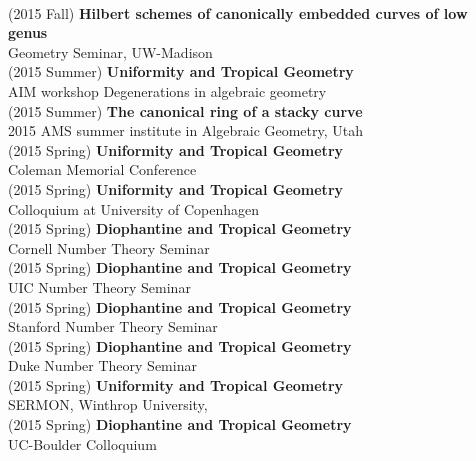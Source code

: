 \documentclass[margin,line]{res}
\begin{document}
\begin{resume}
\vspace{.05cm}\\
(2015 Fall) \textbf{Hilbert schemes of canonically embedded curves of low genus}\\
Geometry Seminar, UW-Madison
\vspace{.05cm}\\
(2015 Summer) \textbf{Uniformity and Tropical Geometry}\\
AIM workshop Degenerations in algebraic geometry
\vspace{.05cm}\\
(2015 Summer) \textbf{The canonical ring of a stacky curve}\\  
2015 AMS summer institute in Algebraic Geometry, Utah
\vspace{.05cm}\\
(2015 Spring) \textbf{Uniformity and Tropical Geometry}\\
Coleman Memorial Conference
\vspace{.05cm}\\
(2015 Spring) \textbf{Uniformity and Tropical Geometry}\\
Colloquium at University of Copenhagen
\vspace{.05cm}\\
(2015 Spring) \textbf{Diophantine and Tropical Geometry}\\
Cornell Number Theory Seminar
\vspace{.05cm}\\
(2015 Spring) \textbf{Diophantine and Tropical Geometry}\\
UIC Number Theory Seminar
\vspace{.05cm}\\
(2015 Spring) \textbf{Diophantine and Tropical Geometry}\\
Stanford Number Theory Seminar
\vspace{.05cm}\\
(2015 Spring) \textbf{Diophantine and Tropical Geometry}\\
Duke Number Theory Seminar
\vspace{.05cm}\\
(2015 Spring) \textbf{Uniformity and Tropical Geometry}\\
SERMON, Winthrop University, 
\vspace{.05cm}\\
(2015 Spring) \textbf{Diophantine and Tropical Geometry}\\
UC-Boulder Colloquium
\vspace{.05cm}\\

\end{resume}
\end{document}

